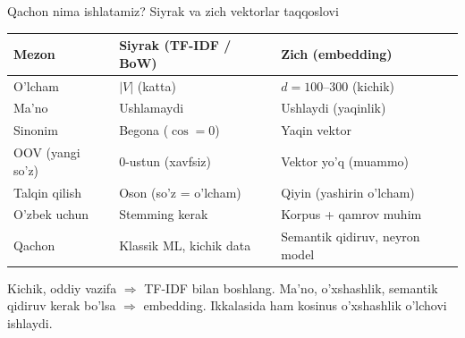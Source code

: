 \documentclass[aspectratio=169,11pt]{beamer}
\begin{document}
\begin{frame}{Qachon nima ishlatamiz? Siyrak va zich vektorlar taqqoslovi}
  \begin{center}\small
  \begin{tabular}{p{3.0cm}p{4.2cm}p{4.2cm}}
    \toprule
    \textbf{Mezon} & \textbf{Siyrak (TF-IDF / BoW)} & \textbf{Zich (embedding)} \\
    \midrule
    O'lcham & $|V|$ (katta) & $d=100$--$300$ (kichik) \\
    Ma'no & Ushlamaydi & Ushlaydi (yaqinlik) \\
    Sinonim & Begona ($\cos=0$) & Yaqin vektor \\
    OOV (yangi so'z) & 0-ustun (xavfsiz) & Vektor yo'q (muammo) \\
    Talqin qilish & Oson (so'z = o'lcham) & Qiyin (yashirin o'lcham) \\
    O'zbek uchun & Stemming kerak & Korpus + qamrov muhim \\
    Qachon & Klassik ML, kichik data & Semantik qidiruv, neyron model \\
    \bottomrule
  \end{tabular}
  \end{center}
  \vspace{4pt}
  \begin{tcolorbox}[okbox,title=Amaliy qoida,top=2pt,bottom=2pt]
    \footnotesize
    Kichik, oddiy vazifa $\Rightarrow$ TF-IDF bilan boshlang.
    Ma'no, o'xshashlik, semantik qidiruv kerak bo'lsa $\Rightarrow$
    embedding. Ikkalasida ham kosinus o'xshashlik o'lchovi ishlaydi.
  \end{tcolorbox}
\end{frame}
\end{document}
